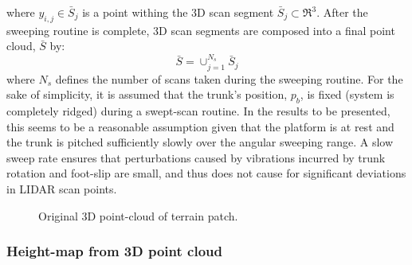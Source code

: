 				where $y_{i,j} \in \bar{S}_{j}$ is a point withing the 3D \Jth scan segment $\bar{S}_{j} \subset \Re^{3}$. After the sweeping routine is complete, 3D scan segments are composed into a final point cloud, $\bar{S}$ by:
				\begin{equation}
					\bar{S} = \cup_{j=1}^{N_{s}} \bar{S}_{j}
				\end{equation}
				where $N_{s}$ defines the number of scans taken during the sweeping routine.
				For the sake of simplicity, it is assumed that the trunk's position, $p_{b}$, is fixed (system is completely ridged) during a swept-scan routine. In the results to be presented, this seems to be a reasonable assumption given that the platform is at rest and the trunk is pitched sufficiently slowly over the angular sweeping range. A slow sweep rate ensures that perturbations caused by vibrations incurred by trunk rotation and foot-slip are small, and thus does not cause for significant deviations in LIDAR scan points.
					\begin{figure}[h!]
						\centering
						\caption{Original 3D point-cloud of terrain patch.}
						\label{fig::pointcloud_terrain_patch}
					\end{figure}


			\subsubsection{Height-map from 3D point cloud}
				
